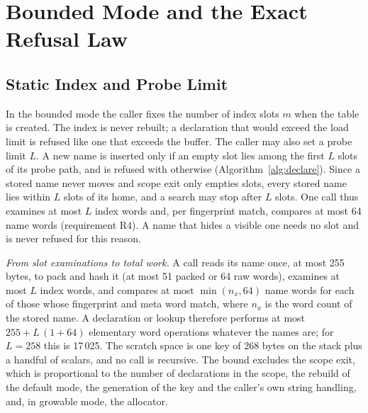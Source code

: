 \begin{table}[t!]
\label{tab:orphan}
\centering

\end{table}

\section{Bounded Mode and the Exact Refusal Law}
\label{sec:bounded}

\subsection{Static Index and Probe Limit}
In the bounded mode the caller fixes the number of index slots $m$ when the table is created. The index is never rebuilt; a declaration that would exceed the load limit is refused like one that exceeds the buffer. The caller may also set a probe limit $L$. A new name is inserted only if an empty slot lies among the first $L$ slots of its probe path, and is refused with  otherwise (Algorithm~\ref{alg:declare}). Since a stored name never moves and scope exit only empties slots, every stored name lies within $L$ slots of its home, and a search may stop after $L$ slots. One call thus examines at most $L$ index words and, per fingerprint match, compares at most 64 name words (requirement R4). A name that hides a visible one needs no slot and is never refused for this reason.

\emph{From slot examinations to total work.} A call reads its name once, at most 255 bytes, to pack and hash it (at most 51 packed or 64 raw words), examines at most $L$ index words, and compares at most $\min(n_x,64)$ name words for each of those whose fingerprint and meta word match, where $n_x$ is the word count of the stored name. A declaration or lookup therefore performs at most $255 + L\,(1+64)$ elementary word operations whatever the names are; for $L=258$ this is 17\,025. The scratch space is one key of 268 bytes on the stack plus a handful of scalars, and no call is recursive. The bound excludes the scope exit, which is proportional to the number of declarations in the scope, the rebuild of the default mode, the generation of the key and the caller's own string handling, and, in growable mode, the allocator.


